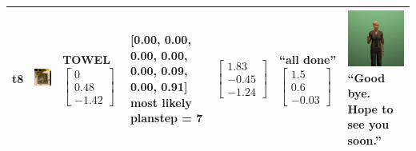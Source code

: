 \begin{longtable}{| V{0.8cm} | V{2.6cm} | V{1.6cm} | V{2.1cm} | V{1.55cm} | V{1.6cm} | V{3.2cm} |}
t8 &
\includegraphics[width=\linewidth]{fig/system/_slow2-towel_.jpg} &
TOWEL
\linebreak\linebreak
$\begin{bmatrix}
0 \\
0.48 \\
-1.42
\end{bmatrix}$ &
[0.00, 0.00, 0.00, 0.00, 0.00, 0.09, 0.00, 0.91] most likely planstep = 7 &
$\begin{bmatrix}
1.83 \\
-0.45 \\
-1.24
\end{bmatrix}$ &
``all done''
\linebreak\linebreak
$\begin{bmatrix}
1.5 \\
0.6 \\
-0.03
\end{bmatrix}$ &
\includegraphics[width=2.6cm]{fig/prompt/_hope-to-see-you-soon_.jpg}
\linebreak
\footnotesize
``Good bye. Hope to see you soon.''
\\ \hline

\end{longtable}


